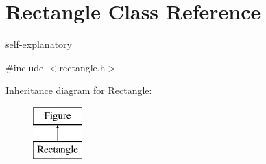 \hypertarget{class_rectangle}{}\section{Rectangle Class Reference}
\label{class_rectangle}


self-\/explanatory  




{\ttfamily \#include $<$rectangle.\+h$>$}

Inheritance diagram for Rectangle\+:\begin{figure}[H]
\begin{center}
\leavevmode
\includegraphics[height=2.000000cm]{class_rectangle}
\end{center}
\end{figure}
